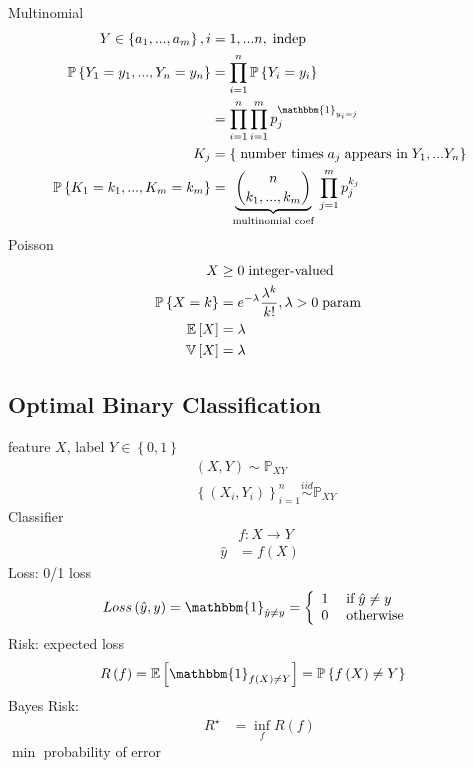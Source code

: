 \documentclass{article}
\begin{document}
Multinomial
\begin{align*}
Y \in \left\{a_{1}, ..., a_{m}\right\}, i &= 1, ...n, \text{\;indep\;}
\\ \mathbb{P}\left\{Y_{1} = y_{1}, ..., Y_{n} = y_{n}\right\} &= \displaystyle\prod_{i=1}^{n} \mathbb{P}\left\{Y_{i} = y_{i}\right\}
\\ &= \displaystyle\prod_{i=1}^{n} \displaystyle\prod_{i=1}^{m} p_{j}^{\mathbbm{1}_{y_{i} = j}}
\\ K_{j} &= \left\{\text{\;number times\;} a_{j} \text{\;appears in\;} Y_{1}, ... Y_{n}\right\}
\\ \mathbb{P}\left\{K_{1} = k_{1}, ..., K_{m} = k_{m}\right\} &= \underbrace{\dbinom{n}{k_{1}, ..., k_{m}}}_{\text{\;multinomial coef\;}} \displaystyle\prod_{j=1}^{m} p_{j}^{k_{j}}
\end{align*}
Poisson
\begin{align*}
X &\geq  0 \text{\;integer-valued\;}
\\ \mathbb{P}\left\{X = k\right\} &= e^{-\lambda} \dfrac{\lambda^{k}}{k!}, \lambda > 0 \text{\;param\;}
\\ \mathbb{E}\left[X\right] &= \lambda
\\ \mathbb{V}\left[X\right]&= \lambda
\end{align*}


\subsection{Optimal Binary Classification}
feature $X $, label $Y  \in \left\{0, 1\right\}$
\begin{align*}
&\left(X , Y\right) \sim  \mathbb{P}_{XY}
\\ &\left\{\left(X_{i}, Y_{i}\right)\right\}_{i=1}^{n} \stackrel{iid}{\sim} \mathbb{P}_{XY}
\end{align*}
Classifier
\begin{align*}
&f : X \to  Y 
\\ \hat{y} &= f\left(X\right)
\end{align*}
Loss: 0/1  loss
\[ Loss\left(\hat{y}, y\right) = \mathbbm{1}_{\hat{y} \neq  y} =\left\{ \begin{array}{ll}
1& \text{\;if\;} \hat{y} \neq  y \\
0& \text{\;otherwise\;} \\
\end{array}\right. \]
Risk: expected loss
\begin{align*}
R\left(f\right)  &= \mathbb{E}\left[\mathbbm{1}_{f\left(X\right) \neq  Y}\right] = \mathbb{P}\left\{f\left(X\right) \neq  Y\right\}
\end{align*}
Bayes Risk:
\begin{align*}
R^\star  &= \displaystyle\inf_{f} R\left(f\right)
\end{align*}
$\displaystyle\min$ probability of error
\end{document}
